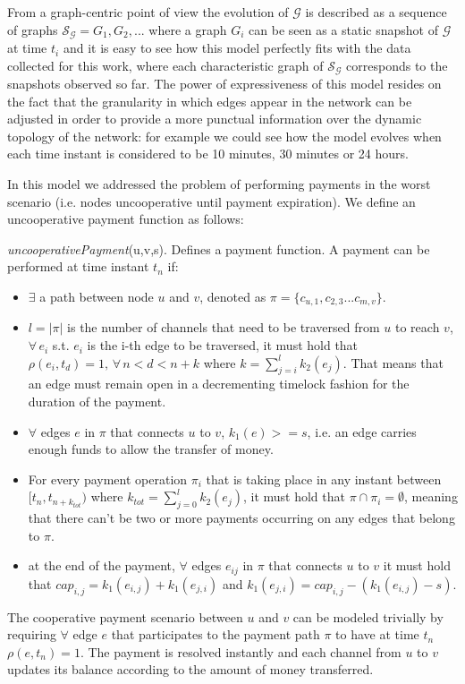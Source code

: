 	From a graph-centric point of view the evolution of $\mathcal{G}$ is described as a sequence of graphs $\mathcal{S}_{\mathcal{G}} = G_1, G_2, ... $ where a graph $G_i$ can be seen as a static snapshot of $\mathcal{G}$ at time $t_i$ and it is easy to see how this model perfectly fits with the data collected for this work, where each characteristic graph of $\mathcal{S}_{\mathcal{G}}$ corresponds to the snapshots observed so far. The power of expressiveness of this model resides on the fact that the granularity in which edges appear in the network can be adjusted in order to provide a more punctual information over the dynamic topology of the network: for example we could see how the model evolves when each time instant is considered to be 10 minutes, 30 minutes or 24 hours.

	In this model we addressed the problem of performing payments in the worst scenario (i.e. nodes uncooperative until payment expiration). We define an uncooperative payment function as follows:
	\begin{definition}
		\textit{uncooperativePayment}(u,v,s). Defines a payment function. A payment can be performed at time instant $t_n$ if:
		\begin{itemize}
			
			\item $\exists$ a path between node $u$ and $v$, denoted as $\pi =  \{c_{u,1}, c_{2,3} ... {c_{m,v}}\}$.
			
			\item $l = |\pi|$ is the number of channels that need to be traversed from $u$ to reach $v$, $\forall \, e_i$ s.t. $e_i$ is the i-th edge to be traversed, it must hold that $\rho(e_i, t_d) = 1, \, \forall \, n < d < n + k$ where $k = \sum_{j = i}^{l}k_2(e_j)$. That means that an edge must remain open in a decrementing timelock fashion for the duration of the payment.
			
			\item $\forall$ edges $e$ in $\pi$ that connects $u$ to $v$, $k_1(e) >= s$, i.e. an edge carries enough funds to allow the transfer of money.
			
			\item For every payment operation $\pi_i$ that is taking place in any instant between $[t_n, t_{n + k_{tot}})$ where $k_{tot} = \sum_{j = 0}^{l} k_2(e_j)$, it must hold that $\pi \cap \pi_i = \emptyset$, meaning that there can't be two or more payments occurring on any edges that belong to $\pi$.
			
			\item at the end of the payment, $\forall$ edges $e_{ij}$ in $\pi$ that connects $u$ to $v$ it must hold that $cap_{i,j} = k_1(e_{i,j}) + k_1(e_{j,i})$ and $k_1(e_{j,i}) = cap_{i,j} - (k_1(e_{i,j}) - s)$.
		\end{itemize}
	\end{definition}

	The cooperative payment scenario between $u$ and $v$ can be modeled trivially by requiring $\forall$ edge $e$ that participates to the payment path $\pi$ to have at time $t_n$ $\rho(e, t_n) = 1$. The payment is resolved instantly and each channel from $u$ to $v$ updates its balance according to the amount of money transferred. 
	
	

